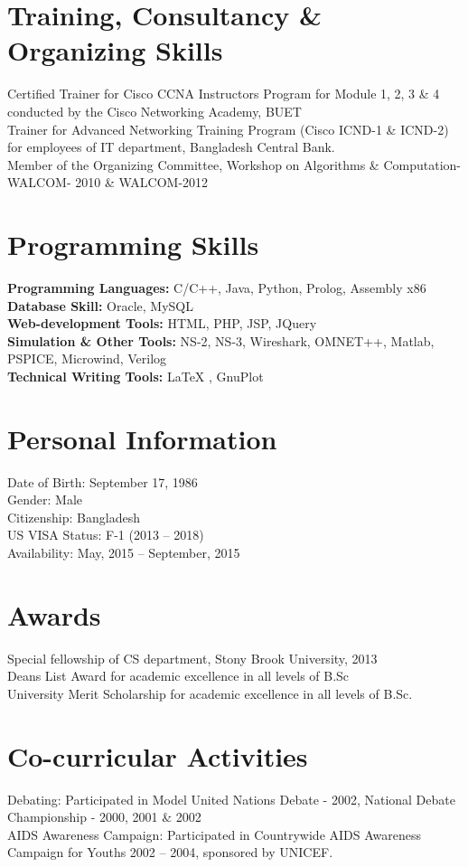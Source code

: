 \documentclass[]{friggeri-cv} %
\begin{document}
\section{Training, Consultancy \& Organizing Skills}
	\bullet{ } Certified Trainer for Cisco CCNA Instructor\textquotesingle{}s
	Program for Module 1, 2, 3 \& 4 conducted by the Cisco Networking Academy, BUET
	\\ \bullet{ }  Trainer for Advanced Networking Training Program (Cisco ICND-1
	\& ICND-2) for employees of IT department, Bangladesh Central Bank.
	\\ \bullet{ } Member of the Organizing Committee, Workshop on Algorithms \&
	Computation- WALCOM- 2010 \& WALCOM-2012 
\section{Programming Skills}
	\bullet{ }\textbf{Programming Languages: } C/C++, Java, Python, Prolog,
	Assembly x86 \\ 
	\bullet{ }\textbf{Database Skill: }Oracle, MySQL \\
	\bullet{ }\textbf{Web-development Tools: }HTML, PHP, JSP, JQuery\\
	\bullet{ }\textbf{Simulation \& Other Tools: }NS-2, NS-3, Wireshark, OMNET++,
	Matlab, PSPICE, Microwind, Verilog\\
	 \bullet{ }\textbf{Technical Writing Tools: }\LaTeX{ },
	GnuPlot
\section{Personal Information}
	\bullet{ } {Date of Birth: } September 17, 1986 \\
	\bullet{ } {Gender: } Male \\
	\bullet{ } {Citizenship: } Bangladesh \\
	\bullet{ } {US VISA Status: } F-1 (2013 -- 2018) \\
	\bullet{ } {Availability: } May, 2015 -- September, 2015
\section{Awards}
 \bullet{ }Special fellowship of CS department, Stony Brook University, 2013 \\
 \bullet{ }Dean\textquotesingle{}s List Award for academic excellence in all levels of B.Sc \\
 \bullet{ } University Merit Scholarship for academic excellence in all levels
 			of B.Sc.
\section{Co-curricular Activities}
	\bullet{ } Debating: Participated in Model United Nations Debate - 2002, National Debate
		Championship - 2000, 2001 \& 2002 \\
	\bullet{ }AIDS Awareness Campaign: Participated in Countrywide AIDS Awareness 
		Campaign for Youths 2002 -- 2004, sponsored by UNICEF.
		\\
\end{document}
